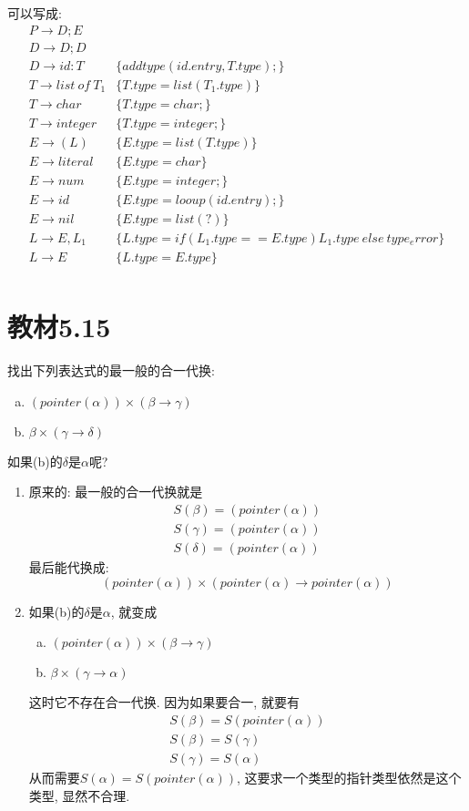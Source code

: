 \documentclass[UTF8]{article}
\begin{document}
\noindent 可以写成:
$$\begin{array}{ll}
P \rightarrow D;E \\
D \rightarrow D;D \\
D \rightarrow id:T & \{addtype(id.entry,T.type);\}\\
T \rightarrow list\ of\ T_1 & \{T.type=list(T_1.type)\} \\
T \rightarrow char & \{T.type=char;\} \\
T \rightarrow integer & \{T.type=integer;\} \\
E \rightarrow (L) & \{E.type=list(T.type)\}\\
E \rightarrow literal & \{E.type=char\} \\
E \rightarrow num & \{E.type=integer;\} \\
E \rightarrow id & \{E.type=looup(id.entry);\} \\
E \rightarrow nil & \{E.type=list(?)\}\\
L \rightarrow E, L_1 & \{L.type=if(L_1.type==E.type)L_1.type\ else\ type_error\} \\
L \rightarrow E & \{L.type=E.type\} \\
\end{array}$$

\section*{教材5.15}
\noindent 找出下列表达式的最一般的合一代换:
\begin{enumerate}[(a) ]
	\item $(pointer(\alpha))\times(\beta\rightarrow\gamma)$
	\item $\beta\times (\gamma\rightarrow\delta)$
\end{enumerate}
\noindent 如果(b)的$\delta$是$\alpha$呢?
\begin{enumerate}[(1). ]
	\item 原来的: 最一般的合一代换就是
	$$\begin{array}{l}
		S(\beta)=(pointer(\alpha))\\
		S(\gamma)=(pointer(\alpha))\\
		S(\delta)=(pointer(\alpha))
	\end{array}$$
	最后能代换成:
	$$(pointer(\alpha))\times(pointer(\alpha)\rightarrow pointer(\alpha))$$
	\item 如果(b)的$\delta$是$\alpha$, 就变成
	\begin{enumerate}[(a) ]
		\item $(pointer(\alpha))\times(\beta\rightarrow\gamma)$
		\item $\beta\times (\gamma\rightarrow\alpha)$
	\end{enumerate}
	这时它不存在合一代换. 因为如果要合一, 就要有
	$$\begin{array}{l}
		S(\beta)=S(pointer(\alpha))\\
		S(\beta)=S(\gamma)\\
		S(\gamma)=S(\alpha)
	\end{array}$$
	从而需要$S(\alpha)=S(pointer(\alpha))$, 这要求一个类型的指针类型依然是这个类型, 显然不合理.
\end{enumerate}
\end{document}

